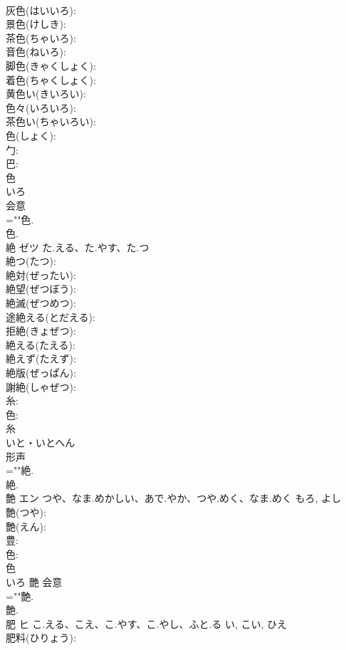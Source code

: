 \documentclass[8pt]{extreport}
\begin{document}
\begin{CJK}{UTF8}{min}
\\	灰色(はいいろ): 
\\	景色(けしき): 
\\	茶色(ちゃいろ): 
\\	音色(ねいろ): 
\\	脚色(きゃくしょく): 
\\	着色(ちゃくしょく): 
\\	黄色い(きいろい): 
\\	色々(いろいろ): 
\\	茶色い(ちゃいろい): 
\\	色(しょく): 
\\	勹: 
\\	巴: 
\\	色	
\\	いろ	
\\	会意 
\\	=""色.
\\	色.
\\	絶	ゼツ	た.える、た.やす、た.つ		
\\	絶つ(たつ): 
\\	絶対(ぜったい): 
\\	絶望(ぜつぼう): 
\\	絶滅(ぜつめつ): 
\\	途絶える(とだえる): 
\\	拒絶(きょぜつ): 
\\	絶える(たえる): 
\\	絶えず(たえず): 
\\	絶版(ぜっぱん): 
\\	謝絶(しゃぜつ): 
\\	糸: 
\\	色: 
\\	糸	
\\	いと・いとへん	
\\	形声 
\\	=""絶.
\\	絶.
\\	艶	エン	つや、なま.めかしい、あで.やか、つや.めく、なま.めく	もろ, よし	
\\	艶(つや): 
\\	艶(えん): 
\\	豊: 
\\	色: 
\\	色	
\\	いろ	艷	会意 
\\	=""艶.
\\	艶.
\\	肥	ヒ	こ.える、こえ、こ.やす、こ.やし、ふと.る	い, こい, ひえ	
\\	肥料(ひりょう): 

\end{CJK}
\end{document}

